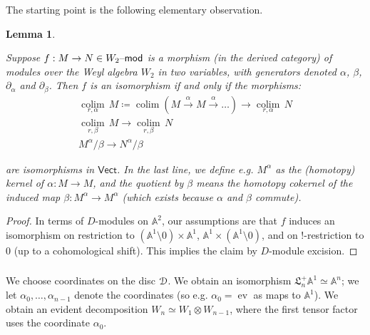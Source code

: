 \documentclass[reqno,11pt]{amsart}
\numberwithin{equation}{subsection}
\newtheorem{lem}[thm]{Lemma}
\theoremstyle{remark}
\newcommand{\xar}[1]{\xrightarrow{#1}}
\newcommand{\bA}{{\mathbb A}}
\newcommand{\sD}{{\EuScript D}}
\newcommand{\fL}{{\mathfrak L}}
\newcommand{\on}{\operatorname}
\newcommand{\mathendash}{\text{\textendash}}
\newcommand{\ev}{\on{ev}}
\newcommand{\Vect}{\mathsf{Vect}}
\renewcommand{\mod}{\mathendash\mathsf{mod}}
\newcommand{\colim}{\on{colim}}
\begin{document}
\subsubsection{}

The starting point is the following elementary observation.

\begin{lem}\label{l:weyl-bimod}

Suppose $f:M \to N \in W_2\mod$ is a morphism (in the derived category) of 
modules over the Weyl algebra $W_2$ in two variables,
with generators denoted $\alpha$, $\beta$, $\partial_{\alpha}$ and $\partial_{\beta}$. 
Then $f$ is an isomorphism if and only if the morphisms:
%
\begin{equation}\label{eq:weyl-bimod}
\begin{gathered}
\underset{r,\alpha}{\colim} \, M \coloneqq \colim(M \xar{\alpha} M \xar{\alpha} \ldots) \to 
\underset{r,\alpha}{\colim} \, N \\
\underset{r,\beta}{\colim} \, M \to \underset{r,\beta}{\colim} \, N \\
M^{\alpha}/\beta \to N^{\alpha}/\beta	
\end{gathered}
\end{equation}

\noindent are isomorphisms in $\Vect$. 
In the last line, we define e.g. $M^{\alpha}$ as the
(homotopy) kernel of $\alpha:M \to M$, and the quotient by $\beta$ means
the homotopy cokernel of the induced map $\beta:M^{\alpha} \to M^{\alpha}$
(which exists because $\alpha$ and $\beta$ commute).
	
\end{lem}

\begin{proof}

In terms of $D$-modules on $\bA^2$, our assumptions are that $f$ induces an isomorphism 
on restriction to $(\bA^1\setminus 0) \times \bA^1$, $\bA^1 \times (\bA^1 \setminus 0)$,
and on $!$-restriction to $0$ (up to a cohomological shift). This implies the claim by 
$D$-module excision.

\end{proof}

\subsubsection{}\label{sss:ff-induction-strat}

We choose coordinates on the disc $\sD$. We obtain an isomorphism 
$\fL_n^+ \bA^1 \simeq \bA^n$; we let $\alpha_0,\ldots,\alpha_{n-1}$ denote the coordinates
(so e.g. $\alpha_0 = \ev$ as maps to $\bA^1$).
We obtain an evident decomposition $W_n \simeq W_1 \otimes W_{n-1}$, where the first
tensor factor uses the coordinate $\alpha_0$.
\end{document}
